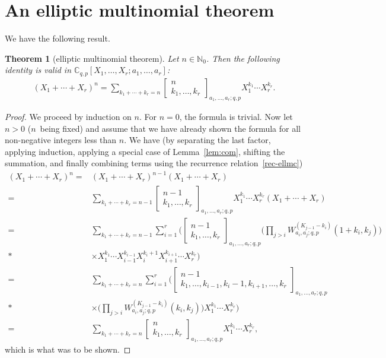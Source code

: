\documentclass[10pt,a4paper]{amsart}
\numberwithin{equation}{section}
\newtheorem{Theorem}{Theorem}[section]
\theoremstyle{definition}
\newcommand{\C}{\mathbb C}
\newcommand{\N}{\mathbb N}
\begin{document}
\section{An elliptic multinomial theorem}\label{sec:ellmthm}
We have the following result.

\begin{Theorem}[elliptic multinomial theorem]\label{ellmthm}
 Let $n\in\N_0$.
 Then the following identity is valid in
$\C_{q,p}[X_1,\dots,X_r;a_1,\dots,a_r]$:
\begin{gather*}%
(X_1+\cdots+X_r)^n=\sum_{k_1+\cdots+k_r=n}
\begin{bmatrix}n\\k_1,\dots,k_r\end{bmatrix}_{a_1,\dots,a_r;q,p}
X_1^{k_1}\cdots X_r^{k_r}.
\end{gather*}
\end{Theorem}

\begin{proof}
We proceed by induction on $n$. For $n=0$, the formula is trivial.
Now let $n>0$ ($n$~being fixed) and assume that we have already
shown the formula for all non-negative integers less than $n$.
We have (by separating the last factor, applying induction,
applying a special case of Lemma~\ref{lem:com}, shifting the summation,
and finally combining terms using the recurrence relation~\eqref{rec-ellmc})
\begin{align*}
(X_1+\cdots+X_r)^n={}&(X_1+\cdots+X_r)^{n-1}(X_1+\cdots+X_r)\\
={}&\sum_{k_1+\cdots+k_r=n-1}
\begin{bmatrix}n-1\\k_1,\dots,k_r\end{bmatrix}_{a_1,\dots,a_r;q,p}
X_1^{k_1}\cdots X_r^{k_r}(X_1+\cdots+X_r)\\
={}&\sum_{k_1+\cdots+k_r=n-1}
\sum_{i=1}^r\bigg(
\begin{bmatrix}n-1\\k_1,\dots,k_r\end{bmatrix}_{a_1,\dots,a_r;q,p}
\bigg(\prod_{j>i}W_{a_i,a_j;q,p}^{(K_{j-1}-k_i)}(1+k_i,k_j)\bigg)\\*
&\times
X_1^{k_1}\cdots X_{i-1}^{k_{i-1}}X_i^{k_i+1}
X_{i+1}^{k_{i+1}}\cdots X_r^{k_r}\bigg)\\
={}&\sum_{k_1+\cdots+k_r=n}
\sum_{i=1}^r\bigg(
\begin{bmatrix}n-1\\k_1,\dots,k_{i-1},k_i-1,k_{i+1},\dots,k_r\end{bmatrix}_{a_1,\dots,a_r;q,p}\\*
&\times
\bigg(\prod_{j>i}W_{a_i,a_j;q,p}^{(K_{j-1}-k_i)}(k_i,k_j)\bigg)
X_1^{k_1}\cdots X_r^{k_r}\bigg)\\
={}&\sum_{k_1+\cdots+k_r=n}
\begin{bmatrix}n\\k_1,\dots,k_r\end{bmatrix}_{a_1,\dots,a_r;q,p}
X_1^{k_1}\cdots X_r^{k_r},
\end{align*}
which is what was to be shown.
\end{proof}
\end{document}
